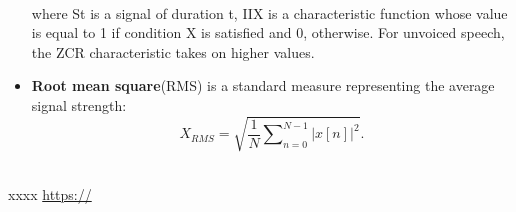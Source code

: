 \documentclass[ams]{U-AizuGT}
\begin{document}
\begin{itemize}
{\begin{equation}
\end{equation}\\
where St is a signal of duration t, II{X} is a characteristic function whose value is equal to 1 if condition X is satisfied and 0, otherwise. For unvoiced speech, the ZCR characteristic takes on higher values.
}
\item {\textbf{Root mean square}(RMS) is a standard measure representing the average signal strength:
\\
\begin{equation}
X_{RMS}=\sqrt{\frac{1}{N}\sum\nolimits_{n=0}^{N-1} |x[n]|^2}.
\end{equation}
\\
}
\end{itemize}



\begin{thebibliography}{99}
\bibitem{}xxxx
\url{https://}
\end{thebibliography}


\end{document}
